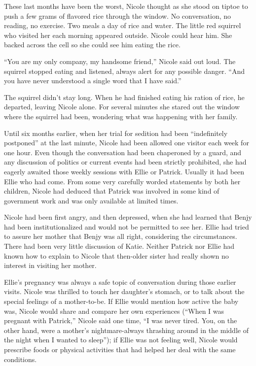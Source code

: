 \documentclass[]{article}
\begin{document}
{{These last months have been the worst, Nicole thought as she stood on tiptoe to push a few grams of flavored rice through the window.  No conversation, no reading, no exercise.  Two meals a day of rice and water.  The little red squirrel who visited her each morning appeared outside.  Nicole could hear him.  She backed across the cell so she could see him eating the rice.

“You are my only company, my handsome friend,” Nicole said out loud.  The squirrel stopped eating and listened, always alert for any possible danger.  “And you have never understood a single word that I have said.”

The squirrel didn’t stay long.  When he had finished eating his ration of rice, he departed, leaving Nicole alone.  For several minutes she stared out the window where the squirrel had been, wondering what was happening with her family.

Until six months earlier, when her trial for sedition had been “indefinitely postponed” at the last minute, Nicole had been allowed one visitor each week for one hour.  Even though the conversation had been chaperoned by a guard, and any discussion of politics or current events had been strictly prohibited, she had eagerly awaited those weekly sessions with Ellie or Patrick.  Usually it had been Ellie who had come.  From some very carefully worded statements by both her children, Nicole had deduced that Patrick was involved in some kind of government work and was only available at limited times.

Nicole had been first angry, and then depressed, when she had learned that Benjy had been institutionalized and would not be permitted to see her.  Ellie had tried to assure her mother that Benjy was all right, considering the circumstances.  There had been very little discussion of Katie.  Neither Patrick nor Ellie had known how to explain to Nicole that then-older sister had really shown no interest in visiting her mother.

Ellie’s pregnancy was always a safe topic of conversation during those earlier visits.  Nicole was thrilled to touch her daughter’s stomach, or to talk about the special feelings of a mother-to-be.  If Ellie would mention how active the baby was, Nicole would share and compare her own experiences (“When I was pregnant with Patrick,” Nicole said one time, “I was never tired.  You, on the other hand, were a mother’s nightmare-always thrashing around in the middle of the night when I wanted to sleep”); if Ellie was not feeling well, Nicole would prescribe foods or physical activities that had helped her deal with the same conditions.

}}
\end{document}
